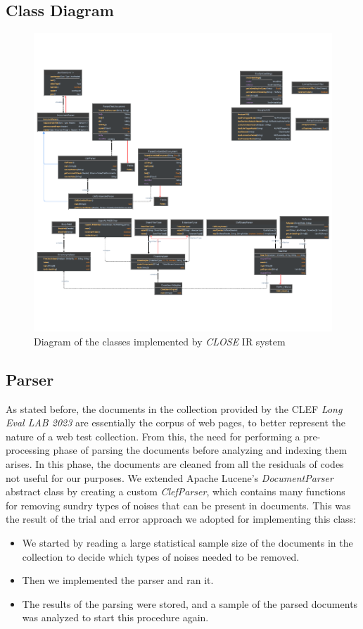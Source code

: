 \subsection{Class Diagram}
\begin{figure}[!h]
    \centering
    \includegraphics[width=0.8\linewidth]{figure/Classes_diagram_white.pdf}
    \caption{Diagram of the classes implemented by \textit{CLOSE} \ac{IR} system}
    \label{fig:Classes_diagram_white}
\end{figure}
\clearpage


\subsection{Parser}
As stated before, the documents in the collection provided by the \ac{CLEF} \textit{Long Eval LAB 2023} are essentially the corpus of web pages, to better represent the nature of a web test collection. From this, the need for performing a pre-processing phase of parsing the documents before analyzing and indexing them arises.
In this phase, the documents are cleaned from all the residuals of codes not useful for our purposes. We extended Apache Lucene's \textit{DocumentParser} abstract class by creating a custom \textit{ClefParser}, which contains many functions for removing sundry types of noises that can be present in documents. This was the result of the trial and error approach we adopted for implementing this class:
\begin{itemize}
\item We started by reading a large statistical sample size of the documents in the collection to decide which types of noises needed to be removed.
\item Then we implemented the parser and ran it.
\item The results of the parsing were stored, and a sample of the parsed documents was analyzed to start this procedure again.
\end{itemize}

